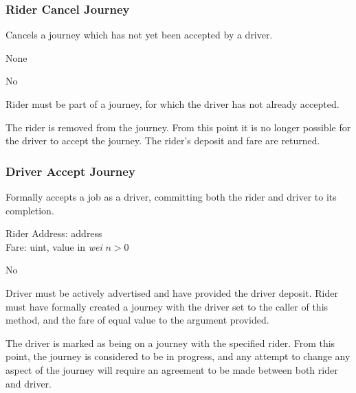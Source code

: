 
\subsubsection{Rider Cancel Journey}

\begin{description}[leftmargin=8em,style=nextline]
	\item [Description]
		Cancels a journey which has not yet been accepted by a driver.
	\item [Arguments]
		None
	\item [Payable]
		No
	\item [Preconditions]
		Rider must be part of a journey, for which the driver has not already accepted.
	\item [Postconditions]
		The rider is removed from the journey. From this point it is no longer possible for the driver to accept the journey. The rider's deposit and fare are returned.
\end{description}

\subsubsection{Driver Accept Journey}

\begin{description}[leftmargin=8em,style=nextline]
	\item [Description]
		Formally accepts a job as a driver, committing both the rider and driver to its completion.
	\item [Arguments]
		Rider Address: address \\
		Fare: uint, value in \textit{wei} $n > 0$
	\item [Payable] 
		No
	\item [Preconditions]
		Driver must be actively advertised and have provided the driver deposit. Rider must have formally created a journey with the driver set to the caller of this method, and the fare of equal value to the argument provided.
	\item [Postconditions]
		The driver is marked as being on a journey with the specified rider. From this point, the journey is considered to be in progress, and any attempt to change any aspect of the journey will require an agreement to be made between both rider and driver.
\end{description}

